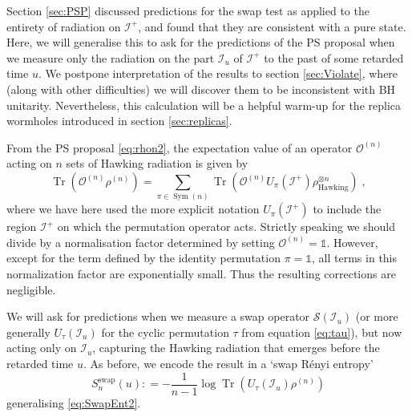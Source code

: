 \documentclass[letterpaper,12pt]{article}
\DeclareMathOperator{\Tr}{Tr}
\DeclareMathOperator{\Sym}{Sym}
\newcommand*{\id}{\mathds{1}}
\newcommand*{\scri}{\mathscr{I}} %
\newcommand*{\swap}{\mathcal{S}} %
\begin{document}
Section \ref{sec:PSP} discussed predictions for the swap test as applied to the entirety of radiation on $\scri^+$, and found that they are consistent with a pure state. Here, we will generalise this to ask for the predictions of the PS proposal when we measure only the radiation on the part $\scri_u$ of $\scri^+$ to the past of some retarded time $u$. We postpone interpretation of the results to section \ref{sec:Violate}, where (along with other difficulties) we will discover them to be inconsistent with BH unitarity.  Nevertheless, this calculation will be a helpful warm-up for the replica wormholes introduced in section \ref{sec:replicas}.

From the PS proposal \eqref{eq:rhon2}, the expectation value of an operator $\mathcal{O}^{(n)}$ acting on $n$ sets of Hawking radiation is given by
\begin{equation}
\label{eq:PSsumperm}
	\Tr\left(\mathcal{O}^{(n)}\rho^{(n)}\right) = \sum_{\pi \in \Sym(n)}  \Tr\left(  \mathcal{O}^{(n)} U_\pi(\scri^+) \rho_\text{Hawking}^{\otimes n}\right)\; ,
\end{equation}
where we have here used the more explicit notation $U_\pi(\scri^+)$ to include the region $\scri^+$ on which the permutation operator acts. Strictly speaking we should divide by a normalisation factor determined by setting $\mathcal{O}^{(n)} =\id $.  However,
except for the term defined by the identity permutation $\pi = \id$,
all terms in this normalization factor are exponentially small.  Thus  the resulting corrections are negligible.

We will ask for predictions when we measure a swap operator $\swap(\scri_u)$ (or more generally $U_\tau(\scri_u)$ for the cyclic permutation $\tau$ from equation \eqref{eq:tau}), but now acting only on $\scri_u$, capturing the Hawking radiation that emerges before the retarded time $u$. As before, we encode the result in a `swap R\'enyi entropy'
\begin{equation}
\label{eq:swapEntu}
S_n^{\text{swap}}(u) : = -\frac{1}{n-1} \log \Tr \left( U_\tau(\scri_u) \rho^{(n)} \right)
\end{equation}
generalising \eqref{eq:SwapEnt2}.
\end{document}

